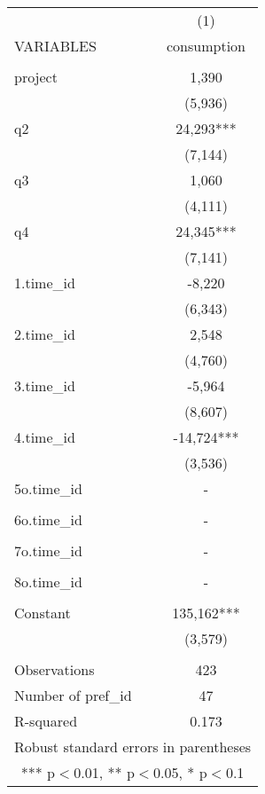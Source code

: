 \documentclass[]{article}
\begin{document}
\begin{tabular}{lc} \hline
 & (1) \\
VARIABLES & consumption \\ \hline
 &  \\
project & 1,390 \\
 & (5,936) \\
q2 & 24,293*** \\
 & (7,144) \\
q3 & 1,060 \\
 & (4,111) \\
q4 & 24,345*** \\
 & (7,141) \\
1.time\_id & -8,220 \\
 & (6,343) \\
2.time\_id & 2,548 \\
 & (4,760) \\
3.time\_id & -5,964 \\
 & (8,607) \\
4.time\_id & -14,724*** \\
 & (3,536) \\
5o.time\_id & - \\
 &  \\
6o.time\_id & - \\
 &  \\
7o.time\_id & - \\
 &  \\
8o.time\_id & - \\
 &  \\
Constant & 135,162*** \\
 & (3,579) \\
 &  \\
Observations & 423 \\
Number of pref\_id & 47 \\
 R-squared & 0.173 \\ \hline
\multicolumn{2}{c}{ Robust standard errors in parentheses} \\
\multicolumn{2}{c}{ *** p$<$0.01, ** p$<$0.05, * p$<$0.1} \\
\end{tabular}
\end{document}
